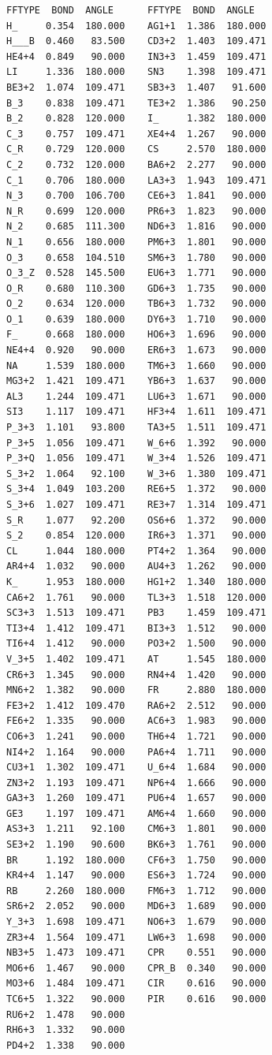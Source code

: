 \documentclass[final,12pt,makeidx,DIV=calc]{article}
\begin{document}
{{{\scriptsize
\begin{verbatim}
FFTYPE  BOND  ANGLE      FFTYPE  BOND  ANGLE
H_     0.354  180.000    AG1+1  1.386  180.000
H___B  0.460   83.500 	 CD3+2  1.403  109.471
HE4+4  0.849   90.000 	 IN3+3  1.459  109.471
LI     1.336  180.000 	 SN3    1.398  109.471
BE3+2  1.074  109.471 	 SB3+3  1.407   91.600
B_3    0.838  109.471 	 TE3+2  1.386   90.250
B_2    0.828  120.000 	 I_     1.382  180.000
C_3    0.757  109.471 	 XE4+4  1.267   90.000
C_R    0.729  120.000 	 CS     2.570  180.000
C_2    0.732  120.000 	 BA6+2  2.277   90.000
C_1    0.706  180.000 	 LA3+3  1.943  109.471
N_3    0.700  106.700 	 CE6+3  1.841   90.000
N_R    0.699  120.000 	 PR6+3  1.823   90.000
N_2    0.685  111.300 	 ND6+3  1.816   90.000
N_1    0.656  180.000 	 PM6+3  1.801   90.000
O_3    0.658  104.510 	 SM6+3  1.780   90.000
O_3_Z  0.528  145.500 	 EU6+3  1.771   90.000
O_R    0.680  110.300 	 GD6+3  1.735   90.000
O_2    0.634  120.000 	 TB6+3  1.732   90.000
O_1    0.639  180.000 	 DY6+3  1.710   90.000
F_     0.668  180.000 	 HO6+3  1.696   90.000
NE4+4  0.920   90.000 	 ER6+3  1.673   90.000
NA     1.539  180.000 	 TM6+3  1.660   90.000
MG3+2  1.421  109.471 	 YB6+3  1.637   90.000
AL3    1.244  109.471 	 LU6+3  1.671   90.000
SI3    1.117  109.471 	 HF3+4  1.611  109.471
P_3+3  1.101   93.800 	 TA3+5  1.511  109.471
P_3+5  1.056  109.471 	 W_6+6  1.392   90.000
P_3+Q  1.056  109.471 	 W_3+4  1.526  109.471
S_3+2  1.064   92.100 	 W_3+6  1.380  109.471
S_3+4  1.049  103.200 	 RE6+5  1.372   90.000
S_3+6  1.027  109.471 	 RE3+7  1.314  109.471
S_R    1.077   92.200 	 OS6+6  1.372   90.000
S_2    0.854  120.000 	 IR6+3  1.371   90.000
CL     1.044  180.000 	 PT4+2  1.364   90.000
AR4+4  1.032   90.000 	 AU4+3  1.262   90.000
K_     1.953  180.000 	 HG1+2  1.340  180.000
CA6+2  1.761   90.000 	 TL3+3  1.518  120.000
SC3+3  1.513  109.471 	 PB3    1.459  109.471
TI3+4  1.412  109.471 	 BI3+3  1.512   90.000
TI6+4  1.412   90.000 	 PO3+2  1.500   90.000
V_3+5  1.402  109.471 	 AT     1.545  180.000
CR6+3  1.345   90.000 	 RN4+4  1.420   90.000
MN6+2  1.382   90.000 	 FR     2.880  180.000
FE3+2  1.412  109.470 	 RA6+2  2.512   90.000
FE6+2  1.335   90.000 	 AC6+3  1.983   90.000
CO6+3  1.241   90.000 	 TH6+4  1.721   90.000
NI4+2  1.164   90.000 	 PA6+4  1.711   90.000
CU3+1  1.302  109.471 	 U_6+4  1.684   90.000
ZN3+2  1.193  109.471 	 NP6+4  1.666   90.000
GA3+3  1.260  109.471 	 PU6+4  1.657   90.000
GE3    1.197  109.471 	 AM6+4  1.660   90.000
AS3+3  1.211   92.100 	 CM6+3  1.801   90.000
SE3+2  1.190   90.600 	 BK6+3  1.761   90.000
BR     1.192  180.000 	 CF6+3  1.750   90.000
KR4+4  1.147   90.000 	 ES6+3  1.724   90.000
RB     2.260  180.000 	 FM6+3  1.712   90.000
SR6+2  2.052   90.000 	 MD6+3  1.689   90.000
Y_3+3  1.698  109.471 	 NO6+3  1.679   90.000
ZR3+4  1.564  109.471 	 LW6+3  1.698   90.000
NB3+5  1.473  109.471 	 CPR    0.551   90.000
MO6+6  1.467   90.000 	 CPR_B  0.340   90.000
MO3+6  1.484  109.471 	 CIR    0.616   90.000
TC6+5  1.322   90.000 	 PIR    0.616   90.000
RU6+2  1.478   90.000 
RH6+3  1.332   90.000 
PD4+2  1.338   90.000 
\end{verbatim}
\normalsize

}}}
\end{document}
